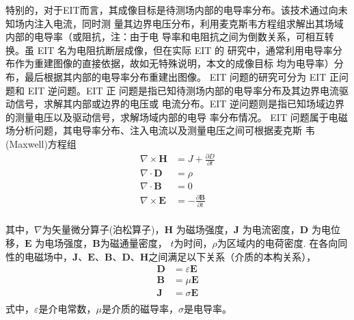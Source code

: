 特别的，对于EIT而言，其成像目标是待测场内部的电导率分布。该技术通过向未知场内注入电流，同时测
量其边界电压分布，利用麦克斯韦方程组求解出其场域内部的电导率（或阻抗，注：由于电
导率和电阻抗之间为倒数关系，可相互转换。虽 EIT 名为电阻抗断层成像，但在实际 EIT 的
研究中，通常利用电导率分布作为重建图像的直接依据，故如无特殊说明，本文的成像目标
均为电导率）分布，最后根据其内部的电导率分布重建出图像。
EIT 问题的研究可分为 EIT 正问题和 EIT 逆问题。EIT 正
问题是指已知待测场内部的电导率分布及其边界电流驱动信号，求解其内部或边界的电压或
电流分布。EIT 逆问题则是指已知场域边界的测量电压以及驱动信号，求解场域内部的电导
率分布情况。
EIT 问题属于电磁场分析问题，其电导率分布、注入电流以及测量电压之间可根据麦克斯
韦(Maxwell)方程组
\begin{equation}
\label{equation:Maxwell}
    \begin{aligned}
        \nabla \times \boldsymbol{H} &= J + \frac{\partial{D}}{\partial{t}} \\
        \nabla \cdot \boldsymbol{D} &= \rho \\
        \nabla \cdot \boldsymbol{B} &= 0 \\
        \nabla \times\boldsymbol{E} &= -\frac{\partial \boldsymbol{B}}{\partial t} \\   
    \end{aligned}
\end{equation}

其中，$\nabla$为矢量微分算子(泊松算子)，$\boldsymbol{H}$ 为磁场强度，$\boldsymbol{J}$ 为电流密度，$\boldsymbol{D}$
为电位移，$\boldsymbol{E}$ 为电场强度，$\boldsymbol{B}$为磁通量密度， $t$为时间，$\rho$为区域内的电荷密度.
在各向同性的电磁场中，$\boldsymbol{J}$、$\boldsymbol{E}$、$\boldsymbol{B}$、$\boldsymbol{D}$、$\boldsymbol{H}$之间满足以下关系（介质的本构关系），
\begin{equation}
  \label{equation:Maxwell_relation}
  \begin{aligned}
    \boldsymbol{D} &= \varepsilon\boldsymbol{E}\\
    \boldsymbol{B} & = \mu\boldsymbol{E}\\
    \boldsymbol{J} & = \sigma\boldsymbol{E}\\
  \end{aligned}
\end{equation}
式中，$\varepsilon$是介电常数，$\mu$是介质的磁导率，$\sigma$是电导率。

